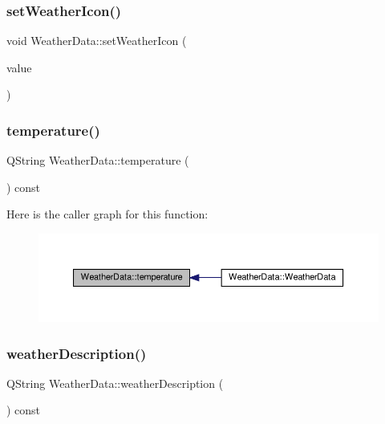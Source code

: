 \subsubsection{\texorpdfstring{set\+Weather\+Icon()}{setWeatherIcon()}}
{\footnotesize\ttfamily void Weather\+Data\+::set\+Weather\+Icon (\begin{DoxyParamCaption}\item[{const Q\+String \&}]{value }\end{DoxyParamCaption})}

\mbox{\label{class_weather_data_a5a193e8410e3a146de59bab224cd88f0}} 
\subsubsection{\texorpdfstring{temperature()}{temperature()}}
{\footnotesize\ttfamily Q\+String Weather\+Data\+::temperature (\begin{DoxyParamCaption}{ }\end{DoxyParamCaption}) const}

Here is the caller graph for this function\+:\nopagebreak
\begin{figure}[H]
\begin{center}
\leavevmode
\includegraphics[width=350pt]{class_weather_data_a5a193e8410e3a146de59bab224cd88f0_icgraph}
\end{center}
\end{figure}
\mbox{\label{class_weather_data_a63a3528697c8681bd32d4d170ec91f76}} 
\subsubsection{\texorpdfstring{weather\+Description()}{weatherDescription()}}
{\footnotesize\ttfamily Q\+String Weather\+Data\+::weather\+Description (\begin{DoxyParamCaption}{ }\end{DoxyParamCaption}) const}


